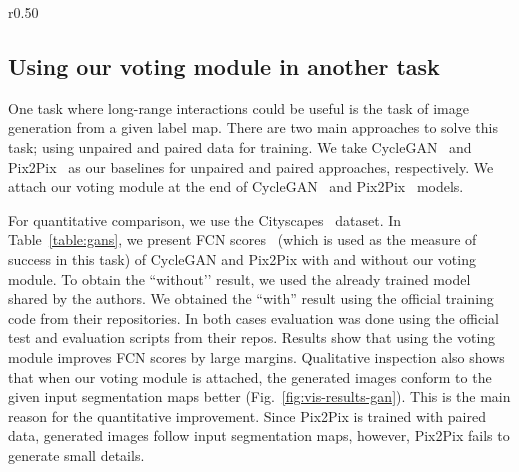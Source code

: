 \documentclass[runningheads]{llncs}
\begin{document}
\setlength\intextsep{0pt}   
\begin{wraptable}[9]{r}{0.50\textwidth}
\caption{Comparison of FCN scores for the ``labels to photo’’ task on the  Cityscapes~\cite{cityscapes} dataset}


\label{table:gans}
\end{wraptable}


\subsection{Using our voting module in another task}
One task where long-range interactions could be useful is the task of image generation from a given label map. There are two main approaches to solve this task; using unpaired and paired data for training. We take CycleGAN~\cite{cyclegan} and Pix2Pix~\cite{pix2pix} as our baselines for unpaired and paired approaches, respectively. We attach our voting module at the end of CycleGAN~\cite{cyclegan} and Pix2Pix~\cite{pix2pix} models.


For quantitative comparison, we use the Cityscapes~\cite{cityscapes} dataset. In Table~\ref{table:gans}, we present FCN scores~\cite{fcn} (which is used as the measure of success in this task) of CycleGAN and Pix2Pix with and without our voting module. To obtain the ``without’’ result, we used the already trained model shared by the authors. We obtained the ``with” result using the official training code from their repositories. In both cases evaluation was done using the official test and evaluation scripts from their repos.  Results show that using the voting module improves FCN scores by large margins.
Qualitative inspection also shows that when our voting module is attached, the generated images conform to the given input segmentation maps better (Fig.~\ref{fig:vis-results-gan}). This is the main reason for the quantitative improvement. Since Pix2Pix is trained with paired data, generated images follow input segmentation maps, however, Pix2Pix fails to generate small details. 
\end{document}
